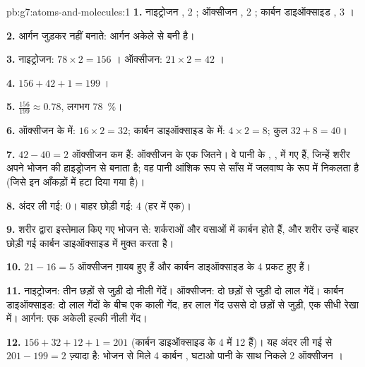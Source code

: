 \begin{solution}{pb:g7:atoms-and-molecules:1}
\textbf{1.} नाइट्रोजन , 2 ; ऑक्सीजन , 2 ; कार्बन
डाइऑक्साइड , 3 ।

\textbf{2.} आर्गन  जुड़कर  नहीं बनाते: आर्गन अकेले
 से बनी है।

\textbf{3.} नाइट्रोजन: $78 \times 2 = 156$ । ऑक्सीजन: $21\times 2 =
42$ ।

\textbf{4.} $156 + 42 + 1 = 199$ ।

\textbf{5.} $\frac{156}{199} \approx 0.78$, लगभग \qty{78}{\percent}।

\textbf{6.} ऑक्सीजन के  में: $16\times 2 = 32$; कार्बन डाइऑक्साइड के
 में: $4 \times 2 = 8$; कुल $32 + 8 = 40$।

\textbf{7.} $42 - 40 = 2$ ऑक्सीजन  कम हैं: ऑक्सीजन के एक 
जितने। वे पानी के , , में गए हैं, जिन्हें शरीर अपने भोजन की
हाइड्रोजन से बनाता है; वह पानी आंशिक रूप से साँस में जलवाष्प के रूप में
निकलता है (जिसे इन आँकड़ों में हटा दिया गया है)।

\textbf{8.} अंदर ली गई: 0। बाहर छोड़ी गई: 4 (हर  में एक)।

\textbf{9.} शरीर द्वारा इस्तेमाल किए गए भोजन से: शर्कराओं और वसाओं में कार्बन
 होते हैं, और शरीर उन्हें बाहर छोड़ी गई कार्बन डाइऑक्साइड में मुक्त करता है।

\textbf{10.} $21 - 16 = 5$ ऑक्सीजन  ग़ायब हुए हैं और कार्बन
डाइऑक्साइड के 4  प्रकट हुए हैं।

\textbf{11.} नाइट्रोजन: तीन छड़ों से जुड़ी दो नीली गेंदें। ऑक्सीजन: दो
छड़ों से जुड़ी दो लाल गेंदें। कार्बन डाइऑक्साइड: दो लाल गेंदों के बीच एक काली
गेंद, हर लाल गेंद उससे दो छड़ों से जुड़ी, एक सीधी रेखा में। आर्गन: एक
अकेली हल्की नीली गेंद।

\textbf{12.} $156 + 32 + 12 + 1 = 201$  (कार्बन डाइऑक्साइड के 4
 में 12  हैं)। यह अंदर ली गई  से $201 - 199 = 2$ 
ज़्यादा है: भोजन से मिले 4 कार्बन , घटाओ पानी के साथ निकले 2 ऑक्सीजन
।
\end{solution}
